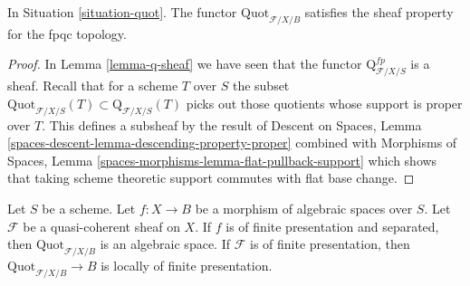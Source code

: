 \begin{lemma}
\label{lemma-quot-sheaf}
In Situation \ref{situation-quot}. The functor $\text{Quot}_{\mathcal{F}/X/B}$
satisfies the sheaf property for the fpqc topology.
\end{lemma}

\begin{proof}
In Lemma \ref{lemma-q-sheaf} we have seen that the functor
$\text{Q}^{fp}_{\mathcal{F}/X/S}$ is a sheaf. Recall that for a
scheme $T$ over $S$ the subset
$\text{Quot}_{\mathcal{F}/X/S}(T) \subset \text{Q}_{\mathcal{F}/X/S}(T)$
picks out those quotients whose support is proper over $T$.
This defines a subsheaf by the result of
Descent on Spaces, Lemma \ref{spaces-descent-lemma-descending-property-proper}
combined with
Morphisms of Spaces, Lemma \ref{spaces-morphisms-lemma-flat-pullback-support}
which shows that taking scheme theoretic support commutes
with flat base change.
\end{proof}

\begin{proposition}
\label{proposition-quot}
Let $S$ be a scheme. Let $f : X \to B$ be a morphism of algebraic
spaces over $S$. Let $\mathcal{F}$ be a quasi-coherent sheaf
on $X$. If $f$ is of finite presentation and separated, then
$\text{Quot}_{\mathcal{F}/X/B}$
is an algebraic space. If $\mathcal{F}$ is of finite presentation,
then $\text{Quot}_{\mathcal{F}/X/B} \to B$ is locally of finite presentation.
\end{proposition}

